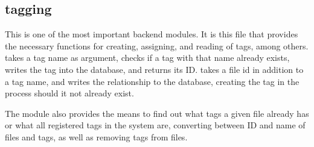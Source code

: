 \subsection{tagging}

This is one of the most important backend modules. It is this file that provides the necessary functions for creating, assigning, and reading of tags, among others.  takes a tag name as argument, checks if a tag with that name already exists, writes the tag into the database, and returns its ID.  takes a file id in addition to a tag name, and writes the relationship to the database, creating the tag in the process should it not already exist. 

The module also provides the means to find out what tags a given file already has or what all registered tags in the system are, converting between ID and name of files and tags, as well as removing tags from files.

